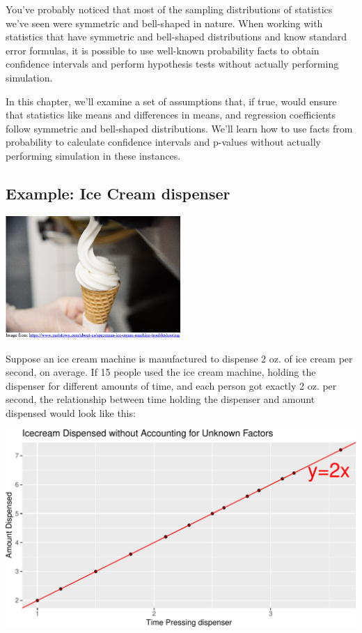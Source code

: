 \documentclass[
  letterpaper,
  DIV=11,
  numbers=noendperiod]{scrreprt}
\begin{document}
You've probably noticed that most of the sampling distributions of
statistics we've seen were symmetric and bell-shaped in nature. When
working with statistics that have symmetric and bell-shaped
distributions and know standard error formulas, it is possible to use
well-known probability facts to obtain confidence intervals and perform
hypothesis tests without actually performing simulation.

In this chapter, we'll examine a set of assumptions that, if true, would
ensure that statistics like means and differences in means, and
regression coefficients follow symmetric and bell-shaped distributions.
We'll learn how to use facts from probability to calculate confidence
intervals and p-values without actually performing simulation in these
instances.

\subsection{Example: Ice Cream
dispenser}\label{example-ice-cream-dispenser}

\includegraphics[width=0.5\textwidth,height=\textheight]{Ice_Cream.png}

Suppose an ice cream machine is manufactured to dispense 2 oz. of ice
cream per second, on average. If 15 people used the ice cream machine,
holding the dispenser for different amounts of time, and each person got
exactly 2 oz. per second, the relationship between time holding the
dispenser and amount dispensed would look like this:

\includegraphics{Ch4_files/figure-pdf/unnamed-chunk-4-1.pdf}
\end{document}
